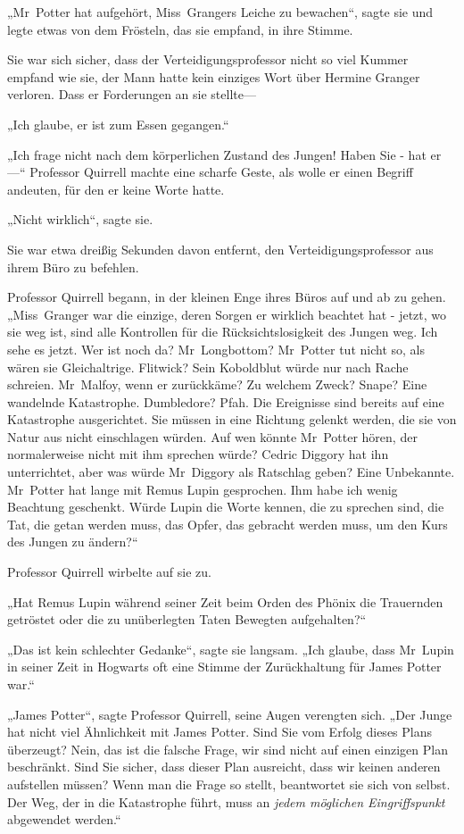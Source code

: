 {„Mr~Potter hat aufgehört, Miss~Grangers Leiche zu bewachen“, sagte sie und legte etwas von dem Frösteln, das sie empfand, in ihre Stimme.

Sie war sich sicher, dass der Verteidigungsprofessor nicht so viel Kummer empfand wie sie, der Mann hatte kein einziges Wort über Hermine Granger verloren. Dass er Forderungen an sie stellte—

„Ich glaube, er ist zum Essen gegangen.“

„Ich frage nicht nach dem körperlichen Zustand des Jungen! Haben Sie - hat er—“ Professor Quirrell machte eine scharfe Geste, als wolle er einen Begriff andeuten, für den er keine Worte hatte.

„Nicht wirklich“, sagte sie.

Sie war etwa dreißig Sekunden davon entfernt, den Verteidigungsprofessor aus ihrem Büro zu befehlen.

Professor Quirrell begann, in der kleinen Enge ihres Büros auf und ab zu gehen. „Miss~Granger war die einzige, deren Sorgen er wirklich beachtet hat - jetzt, wo sie weg ist, sind alle Kontrollen für die Rücksichtslosigkeit des Jungen weg. Ich sehe es jetzt. Wer ist noch da? Mr~Longbottom? Mr~Potter tut nicht so, als wären sie Gleichaltrige. Flitwick? Sein Koboldblut würde nur nach Rache schreien. Mr~Malfoy, wenn er zurückkäme? Zu welchem Zweck? Snape? Eine wandelnde Katastrophe. Dumbledore? Pfah. Die Ereignisse sind bereits auf eine Katastrophe ausgerichtet. Sie müssen in eine Richtung gelenkt werden, die sie von Natur aus nicht einschlagen würden. Auf wen könnte Mr~Potter hören, der normalerweise nicht mit ihm sprechen würde? Cedric Diggory hat ihn unterrichtet, aber was würde Mr~Diggory als Ratschlag geben? Eine Unbekannte. Mr~Potter hat lange mit Remus Lupin gesprochen. Ihm habe ich wenig Beachtung geschenkt. Würde Lupin die Worte kennen, die zu sprechen sind, die Tat, die getan werden muss, das Opfer, das gebracht werden muss, um den Kurs des Jungen zu ändern?“

Professor Quirrell wirbelte auf sie zu.

„Hat Remus Lupin während seiner Zeit beim Orden des Phönix die Trauernden getröstet oder die zu unüberlegten Taten Bewegten aufgehalten?“

„Das ist kein schlechter Gedanke“, sagte sie langsam. „Ich glaube, dass Mr~Lupin in seiner Zeit in Hogwarts oft eine Stimme der Zurückhaltung für James Potter war.“

„James Potter“, sagte Professor Quirrell, seine Augen verengten sich. „Der Junge hat nicht viel Ähnlichkeit mit James Potter. Sind Sie vom Erfolg dieses Plans überzeugt? Nein, das ist die falsche Frage, wir sind nicht auf einen einzigen Plan beschränkt. Sind Sie sicher, dass dieser Plan ausreicht, dass wir keinen anderen aufstellen müssen? Wenn man die Frage so stellt, beantwortet sie sich von selbst. Der Weg, der in die Katastrophe führt, muss an \emph{jedem möglichen Eingriffspunkt} abgewendet werden.“

}
